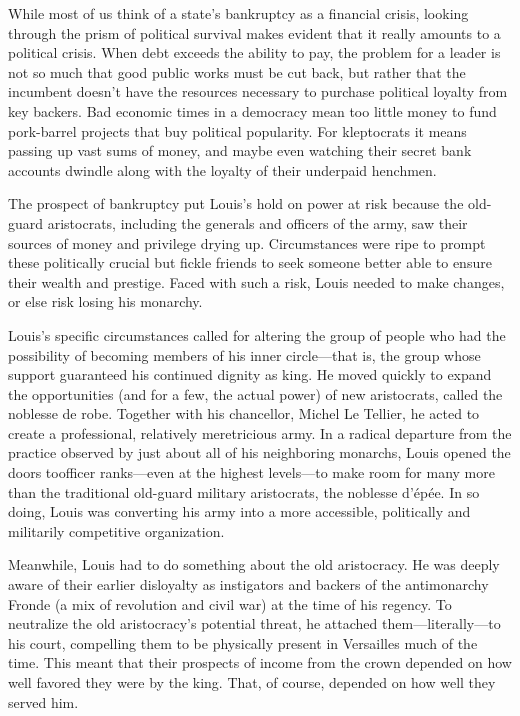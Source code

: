\documentclass[10pt]{article}
\begin{document}
{\large While most of us think of a state's bankruptcy as a financial crisis,
looking through the prism of political survival makes evident that it really
amounts to a political crisis. When debt exceeds the ability to pay, the problem
for a leader is not so much that good public works must be cut back, but rather
that the incumbent doesn't have the resources necessary to purchase political
loyalty from key backers. Bad economic times in a democracy mean too little money
to fund pork-barrel projects that buy political popularity. For kleptocrats it
means passing up vast sums of money, and maybe even watching their secret bank
accounts dwindle along with the loyalty of their underpaid henchmen.}

{\large The prospect of bankruptcy put Louis's hold on power at risk because the
old-guard aristocrats, including the generals and officers of the army, saw their
sources of money and privilege drying up. Circumstances were ripe to prompt these
politically crucial but fickle friends to seek someone better able to ensure
their wealth and prestige. Faced with such a risk, Louis needed to make changes,
or else risk losing his monarchy.}

{\large Louis's specific circumstances called for altering the group of people
who had the possibility of becoming members of his inner circle---that is, the
group whose support guaranteed his continued dignity as king. He moved quickly to
expand the opportunities (and for a few, the actual power) of new aristocrats,
called the noblesse de robe. Together with his chancellor, Michel Le Tellier, he
acted to create a professional, relatively meretricious army. In a radical
departure from the practice observed by just about all of his neighboring
monarchs, Louis opened the doors toofficer ranks---even at the highest
levels---to make room for many more than the traditional old-guard military
aristocrats, the noblesse d'\'{e}p\'{e}e. In so doing, Louis was converting his
army into a more accessible, politically and militarily competitive
organization.}

{\large Meanwhile, Louis had to do something about the old aristocracy. He was
deeply aware of their earlier disloyalty as instigators and backers of the
antimonarchy Fronde (a mix of revolution and civil war) at the time of his
regency. To neutralize the old aristocracy's potential threat, he attached
them---literally---to his court, compelling them to be physically present in
Versailles much of the time. This meant that their prospects of income from the
crown depended on how well favored they were by the king. That, of course,
depended on how well they served him.}
\end{document}
